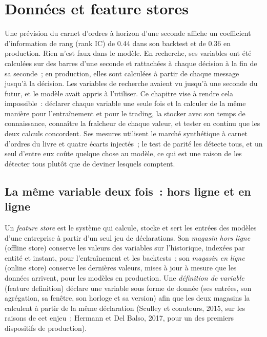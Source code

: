 \chapter{Données et feature stores}\label{ch:ml:data-and-feature-stores}

Une prévision du carnet d'ordres à horizon d'une seconde affiche un coefficient d'information de rang (rank IC) de 0.44 dans son backtest et de 0.36 en production. Rien n'est
faux dans le modèle. En recherche, ses variables ont été calculées sur des barres d'une seconde et rattachées à chaque décision à la fin de
sa seconde~; en production, elles sont calculées à partir de chaque message jusqu'à la décision. Les variables de recherche avaient vu jusqu'à une
seconde du futur, et le modèle avait appris à l'utiliser. Ce chapitre vise à rendre cela impossible~: déclarer chaque
variable une seule fois et la calculer de la même manière pour l'entraînement et pour le trading, la stocker avec son temps de connaissance, connaître
la fraîcheur de chaque valeur, et tester en continu que les deux calculs concordent. Ses mesures utilisent le marché synthétique à carnet d'ordres du livre et
quatre écarts injectés~; le test de parité les détecte tous, et un seul d'entre eux coûte quelque chose au modèle, ce qui est
une raison de les détecter tous plutôt que de deviner lesquels comptent.

\section{La même variable deux fois~: hors ligne et en ligne}

\begin{definition}\label{def:ml:data-and-feature-stores:store}
Un \emph{feature store} est le système qui calcule, stocke et sert les entrées des modèles d'une entreprise à partir d'un seul
jeu de déclarations. Son \emph{magasin hors ligne} (offline store) conserve les valeurs des variables sur l'historique, indexées par entité et
instant, pour l'entraînement et les backtests~; son \emph{magasin en ligne} (online store) conserve les dernières valeurs, mises à jour à mesure que les données
arrivent, pour les modèles en production. Une \emph{définition de variable} (feature definition) déclare une variable sous forme de donnée (ses
entrées, son agrégation, sa fenêtre, son horloge et sa version) afin que les deux magasins la calculent à partir de la même déclaration
(Sculley et coauteurs, 2015, sur les raisons de cet enjeu~; Hermann et Del Balso, 2017, pour un des premiers dispositifs de production).
\end{definition}

